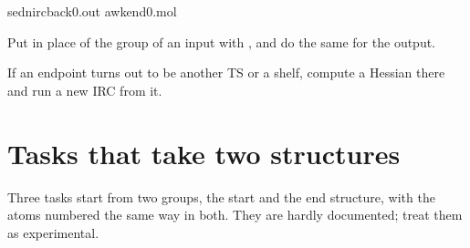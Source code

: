 \documentclass[letterpaper,10pt,english,openany,oneside]{sphinxmanual}
\begin{document}
\begin{sphinxVerbatim}[commandchars=\\\{\}]
sed\PYGZhy{}nirc\PYGZus{}back0.out
awk\PYGZgt{}end0.mol
\end{sphinxVerbatim}



\sphinxAtStartPar
Put  in place of the  group of an input with , and do the same for the
 output.





\sphinxAtStartPar
If an endpoint turns out to be another TS or a shelf, compute a Hessian there and run a new IRC from it.




\section{Tasks that take two structures}
\label{\detokenize{tasks/ts-irc-scan:tasks-that-take-two-structures}}
\sphinxAtStartPar
Three tasks start from two  groups, the start and the end structure, with the atoms numbered the same
way in both. They are hardly documented; treat them as experimental.
\end{document}
